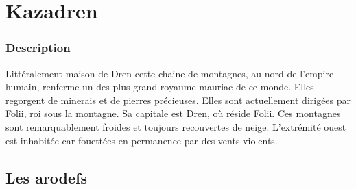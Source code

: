 \section{Kazadren}
\subsubsection{Description}
\hypertarget{kazadren}{}Littéralement maison de Dren cette chaine de montagnes, au nord de l'empire humain, renferme un des plus grand royaume mauriac de ce monde.
Elles regorgent de minerais et de pierres précieuses. Elles sont actuellement dirigées par Folii, roi sous la montagne.
Sa capitale est Dren, où réside Folii. Ces montagnes sont remarquablement froides et toujours recouvertes de neige.  
L'extrémité ouest est inhabitée car fouettées en permanence par des vents violents.
\subsection{Les arodefs}
